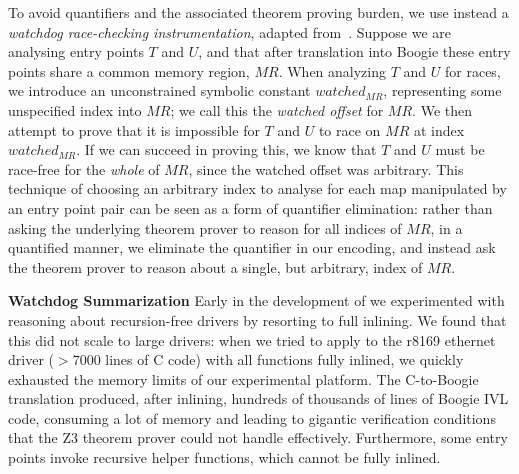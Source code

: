 To avoid quantifiers and the associated theorem proving burden, we use instead a \emph{watchdog race-checking instrumentation}, adapted from~\cite{bardsley2014engineering}.  Suppose we are analysing entry points $T$ and $U$, and that after translation into Boogie these entry points share a common memory region, $\mathit{MR}$.  When analyzing $T$ and $U$ for races, we introduce an unconstrained symbolic constant $\mathit{watched}_{\mathit{MR}}$, representing some unspecified index into $\mathit{MR}$; we call this the \emph{watched offset} for $\mathit{MR}$.  We then attempt to prove that it is impossible for $T$ and $U$ to race on $\mathit{MR}$ at index $\mathit{watched}_{\mathit{MR}}$.  If we can succeed in proving this, we know that $T$ and $U$ must be race-free for the \emph{whole} of $\mathit{MR}$, since the watched offset was arbitrary.  This technique of choosing an arbitrary index to analyse for each map manipulated by an entry point pair can be seen as a form of quantifier elimination: rather than asking the underlying theorem prover to reason for all indices of $\mathit{MR}$, in a quantified manner, we eliminate the quantifier in our encoding, and instead ask the theorem prover to reason about a single, but arbitrary, index of $\mathit{MR}$.

\medskip\noindent\textbf{Watchdog Summarization }  
%
Early in the development of \whoop we experimented with reasoning about recursion-free drivers by resorting to full inlining.  We found that this did not scale to large drivers: when we tried to apply \whoop to the r8169 ethernet driver ($>$7000 lines of C code) with all functions fully inlined, we quickly exhausted the memory limits of our experimental platform.    The C-to-Boogie translation produced, after inlining, hundreds of thousands of lines of Boogie IVL code, consuming a lot of memory and leading to gigantic verification conditions that the Z3 theorem prover could not handle effectively.    Furthermore, some entry points invoke recursive helper functions, which cannot be fully inlined.

